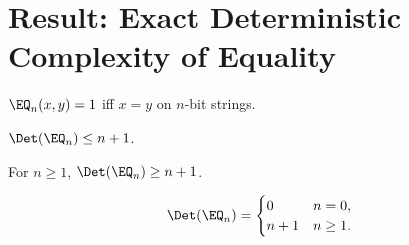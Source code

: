 \chapter{Result: Exact Deterministic Complexity of Equality}

\begin{definition}
  \label{def:eq_fn}
  \leanok
  $\EQ_n(x,y)=1$ iff $x=y$ on $n$-bit strings.
\end{definition}

\begin{theorem}
  \label{thm:eq_upper}
  \leanok
  $\Det(\EQ_n) \le n+1$.
\end{theorem}

\begin{theorem}
  \label{thm:eq_lower}
  \leanok
  For $n \ge 1$, $\Det(\EQ_n) \ge n+1$.
\end{theorem}

\begin{theorem}
  \label{thm:eq_exact}
  \leanok
  \[
    \Det(\EQ_n) = \begin{cases}0 & n=0, \\ n+1 & n\ge1.\end{cases}
  \]
\end{theorem}
